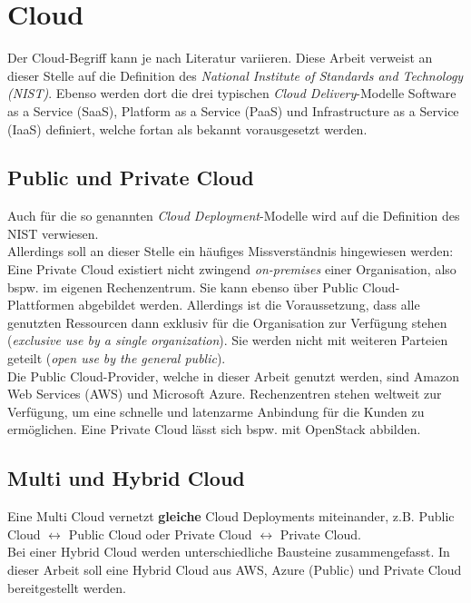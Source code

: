 \section{Cloud}\label{cloud}
Der Cloud-Begriff kann je nach Literatur variieren. Diese Arbeit verweist an dieser Stelle auf die Definition des \textit{National Institute of Standards and Technology (NIST)}. Ebenso werden dort die drei typischen \textit{Cloud Delivery}-Modelle Software as a Service (SaaS), Platform as a Service (PaaS) und Infrastructure as a Service (IaaS) definiert, welche fortan als bekannt vorausgesetzt werden.\cite{mell2011}

\subsection{Public und Private Cloud}
Auch für die so genannten \textit{Cloud \gls{Deployment}}-Modelle wird auf die Definition des NIST verwiesen.\cite{mell2011}\\
Allerdings soll an dieser Stelle ein häufiges Missverständnis hingewiesen werden: Eine Private Cloud existiert nicht zwingend \textit{on-premises} einer Organisation, also bspw. im eigenen Rechenzentrum. Sie kann ebenso über Public Cloud-Plattformen abgebildet werden. Allerdings ist die Voraussetzung, dass alle genutzten Ressourcen dann exklusiv für die Organisation zur Verfügung stehen (\textit{exclusive use by a single organization}). Sie werden nicht mit weiteren Parteien geteilt (\textit{open use by the general public}).\\
Die Public Cloud-Provider, welche in dieser Arbeit genutzt werden, sind Amazon Web Services (AWS) und Microsoft Azure. Rechenzentren stehen weltweit zur Verfügung, um eine schnelle und latenzarme Anbindung für die Kunden zu ermöglichen. Eine Private Cloud lässt sich bspw. mit OpenStack abbilden\cite{sefraoui2012openstack}.

\subsection{Multi und Hybrid Cloud}
Eine Multi Cloud vernetzt \textbf{gleiche} Cloud \gls{Deployments} miteinander, z.B. Public Cloud 	$\leftrightarrow$ Public Cloud oder Private Cloud $\leftrightarrow$ Private Cloud.\\
Bei einer Hybrid Cloud werden unterschiedliche Bausteine zusammengefasst. In dieser Arbeit soll eine Hybrid Cloud aus AWS, Azure (Public) und Private Cloud bereitgestellt werden.

